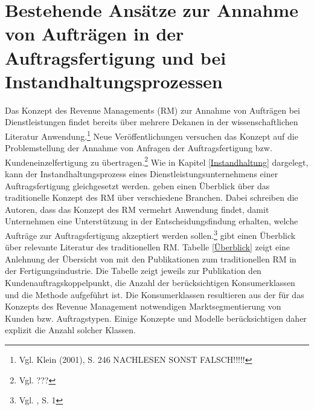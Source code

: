 \chapter{Bestehende Ansätze zur Annahme von Aufträgen in der Auftragsfertigung und bei Instandhaltungsprozessen}
\setcounter{footnote}{4}  %

Das Konzept des Revenue Managements (RM) zur Annahme von Aufträgen bei Dienstleistungen findet bereits über mehrere Dekanen in der wissenschaftlichen Literatur Anwendung.\footnote{Vgl. Klein (2001), S. 246 NACHLESEN SONST FALSCH!!!!!} Neue Veröffentlichungen versuchen das Konzept auf die Problemstellung der Annahme von Anfragen der Auftragsfertigung bzw. Kundeneinzelfertigung zu übertragen.\footnote{Vgl. ???} Wie in Kapitel \ref{Instandhaltung} dargelegt, kann der Instandhaltungsprozess eines Dienstleistungsunternehmens einer Auftragsfertigung gleichgesetzt werden. \cite{kimms2005revenue} geben einen Überblick über das traditionelle Konzept des RM über verschiedene Branchen. Dabei schreiben die Autoren, dass das Konzept des RM vermehrt Anwendung findet, damit Unternehmen eine Unterstützung in der Entscheidungsfindung erhalten, welche Aufträge zur Auftragsfertigung akzeptiert werden sollen.\footnote{Vgl. \cite{kimms2005revenue}, S. 1} \cite{quante2009management} gibt einen Überblick über relevante Literatur des traditionellen RM. Tabelle \ref{Überblick} zeigt eine Anlehnung der Übersicht von \cite{quante2009management} mit den Publikationen zum traditionellen RM in der Fertigungsindustrie. Die Tabelle zeigt jeweils zur Publikation den Kundenauftragskoppelpunkt, die Anzahl der berücksichtigen Konsumerklassen und die Methode aufgeführt ist. Die Konsumerklassen resultieren aus der für das Konzepts des Revenue Management notwendigen Marktsegmentierung von Kunden bzw. Auftragstypen. Einige Konzepte und Modelle berücksichtigen daher explizit die Anzahl solcher Klassen.


